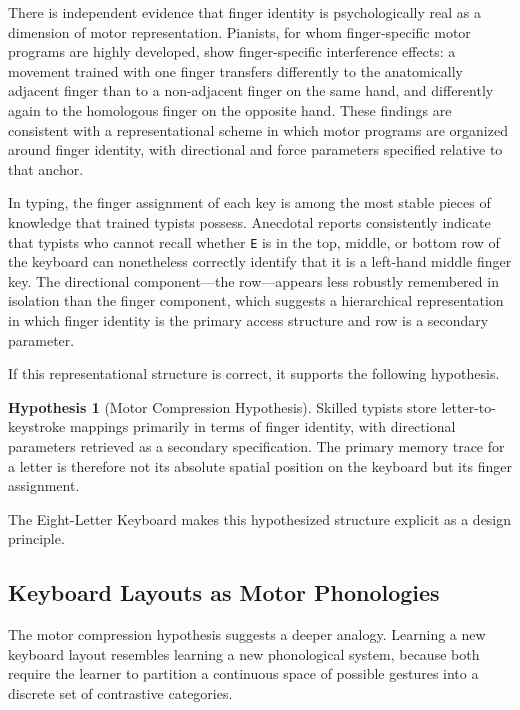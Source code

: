 \documentclass[12pt,a4paper]{article}
\theoremstyle{plain}
\theoremstyle{definition}
\newtheorem{hypothesis}{Hypothesis}
\theoremstyle{remark}
\begin{document}
There is independent evidence that finger identity is psychologically real as a
dimension of motor representation. Pianists, for whom finger-specific motor
programs are highly developed, show finger-specific interference effects: a
movement trained with one finger transfers differently to the anatomically
adjacent finger than to a non-adjacent finger on the same hand, and differently
again to the homologous finger on the opposite hand. These findings are consistent
with a representational scheme in which motor programs are organized around finger
identity, with directional and force parameters specified relative to that anchor.

In typing, the finger assignment of each key is among the most stable pieces of
knowledge that trained typists possess. Anecdotal reports consistently indicate
that typists who cannot recall whether \texttt{E} is in the top, middle, or
bottom row of the keyboard can nonetheless correctly identify that it is a
left-hand middle finger key. The directional component---the row---appears less
robustly remembered in isolation than the finger component, which suggests a
hierarchical representation in which finger identity is the primary access
structure and row is a secondary parameter.

If this representational structure is correct, it supports the following
hypothesis.

\begin{hypothesis}[Motor Compression Hypothesis]
Skilled typists store letter-to-keystroke mappings primarily in terms of finger
identity, with directional parameters retrieved as a secondary specification. The
primary memory trace for a letter is therefore not its absolute spatial position
on the keyboard but its finger assignment.
\end{hypothesis}

The Eight-Letter Keyboard makes this hypothesized structure explicit as a design
principle.

\subsection{Keyboard Layouts as Motor Phonologies}

The motor compression hypothesis suggests a deeper analogy. Learning a new
keyboard layout resembles learning a new phonological system, because both
require the learner to partition a continuous space of possible gestures into
a discrete set of contrastive categories.
\end{document}
